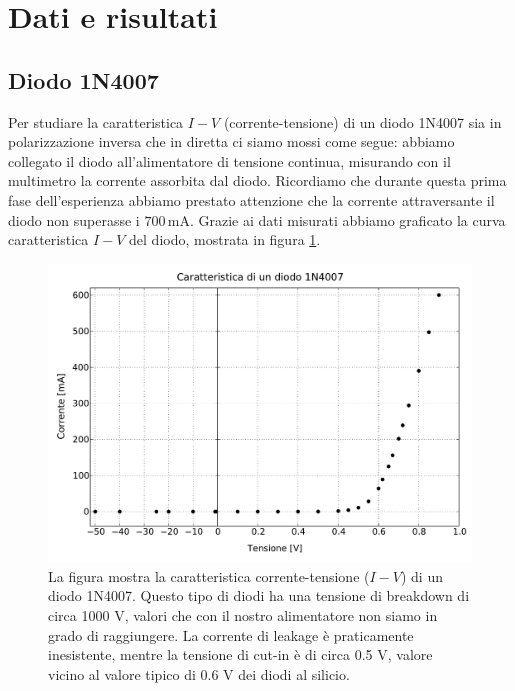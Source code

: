 \section*{Dati e risultati}

\subsection*{Diodo 1N4007}

Per studiare la caratteristica $I-V$ (corrente-tensione) di un diodo 1N4007 sia in polarizzazione inversa che in diretta ci siamo mossi come segue: abbiamo collegato il diodo all'alimentatore di tensione continua, misurando con il multimetro la corrente assorbita dal diodo.
Ricordiamo che durante questa prima fase dell'esperienza abbiamo prestato attenzione che la corrente attraversante il diodo non superasse i $700\,\si{\milli\ampere}$.
Grazie ai dati misurati abbiamo graficato la curva caratteristica $I-V$ del diodo, mostrata in figura \ref{fig:diodo}.

\begin{figure}
    \includegraphics[scale=0.50]{diodo.pdf}
    \caption{La figura mostra la caratteristica corrente-tensione ($I-V$) di un diodo 1N4007. Questo tipo di diodi ha una tensione di breakdown di circa 1000 V, valori che con il nostro alimentatore non siamo in grado di raggiungere.
    La corrente di leakage è praticamente inesistente, mentre la tensione di cut-in è di circa 0.5 V, valore vicino al valore tipico di 0.6 V dei diodi al silicio. }
    \label{fig:diodo}
\end{figure}

